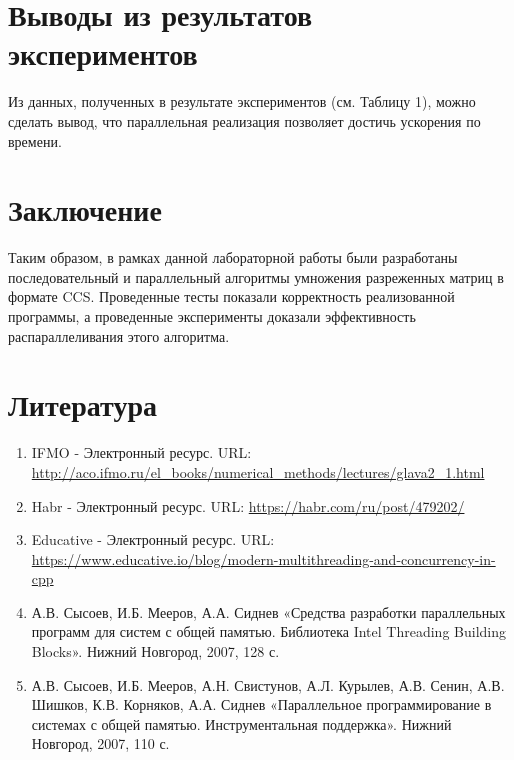 \documentclass{report}
\begin{document}
\newpage

\section*{Выводы из результатов экспериментов}
\par Из данных, полученных в результате экспериментов (см. Таблицу 1), можно сделать вывод, что параллельная реализация позволяет достичь ускорения по времени.
\newpage

\section*{Заключение}
Таким образом, в рамках данной лабораторной работы были разработаны последовательный и параллельный алгоритмы умножения разреженных матриц в формате CCS. Проведенные тесты показали корректность реализованной программы, а проведенные эксперименты доказали эффективность распараллеливания этого алгоритма.
\newpage

\section*{Литература}
\begin{enumerate}
\item IFMO - Электронный ресурс. URL: \newline \url{http://aco.ifmo.ru/el_books/numerical_methods/lectures/glava2_1.html}
\item Habr - Электронный ресурс. URL: \newline \url{https://habr.com/ru/post/479202/}
\item Educative - Электронный ресурс. URL: \newline \url{https://www.educative.io/blog/modern-multithreading-and-concurrency-in-cpp}
\item А.В. Сысоев, И.Б. Мееров, А.А. Сиднев «Средства разработки параллельных программ для систем с общей памятью. Библиотека Intel Threading Building Blocks». Нижний Новгород, 2007, 128 с. 
\item А.В. Сысоев, И.Б. Мееров, А.Н. Свистунов, А.Л. Курылев, А.В. Сенин, А.В. Шишков, К.В. Корняков, А.А. Сиднев «Параллельное программирование в системах с общей
памятью. Инструментальная поддержка». Нижний Новгород, 2007, 110 с. 
\end{enumerate}
\end{document}
